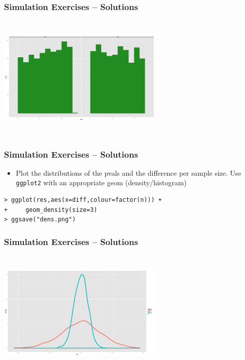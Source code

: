 \documentclass[xcolor={table}]{beamer}
\begin{document}
\begin{frame}[fragile]\frametitle{Simulation Exercises -- Solutions} 
\begin{center}
\includegraphics[width=8cm,height=6cm]{hist.png}
\end{center}
\end{frame}

\begin{frame}[fragile]\frametitle{Simulation Exercises -- Solutions} 
\begin{itemize}
\item Plot the distributions of the pvals and the difference per sample size. Use \texttt{ggplot2} with an appropriate geom (density/histogram)
\end{itemize}\small
\begin{verbatim}
> ggplot(res,aes(x=diff,colour=factor(n))) +
+     geom_density(size=3)
> ggsave("dens.png")
\end{verbatim}
\end{frame}

\begin{frame}[fragile]\frametitle{Simulation Exercises -- Solutions} 
\begin{center}
\includegraphics[width=8cm,height=6cm]{dens.png}
\end{center}
\end{frame}
\end{document}
